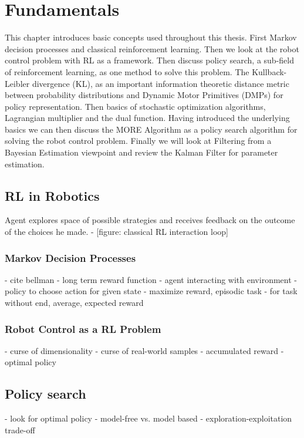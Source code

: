 
\chapter{Fundamentals}
This chapter introduces basic concepts used throughout this thesis.
First Markov decision processes and classical reinforcement learning.
Then we look at the robot control problem with RL as a framework.
Then discuss policy search, a sub-field of reinforcement learning,
as one method to solve this problem.
The Kullback-Leibler divergence (KL), as an important information theoretic
distance metric between probability distributions and Dynamic Motor
Primitives (DMPs) for policy representation.
Then basics of stochastic optimization algorithms, Lagrangian multiplier
and the dual function.
Having introduced the underlying basics we can then discuss the MORE Algorithm as a policy search algorithm
for solving the robot control problem.
Finally we will look at Filtering from a Bayesian Estimation viewpoint and
review the Kalman Filter for parameter estimation.

\section{RL in Robotics}
Agent explores space of possible strategies and receives feedback on the outcome of
the choices he made.
- [figure: classical RL interaction loop]

\subsection{Markov Decision Processes}
- cite bellman
- long term reward function
- agent interacting with environment
- policy to choose action for given state
- maximize reward, episodic task
- for task without end, average, expected reward

\subsection{Robot Control as a RL Problem}
- curse of dimensionality
- curse of real-world samples
- accumulated reward
- optimal policy

\section{Policy search}
- look for optimal policy
- model-free vs. model based
- exploration-exploitation trade-off

